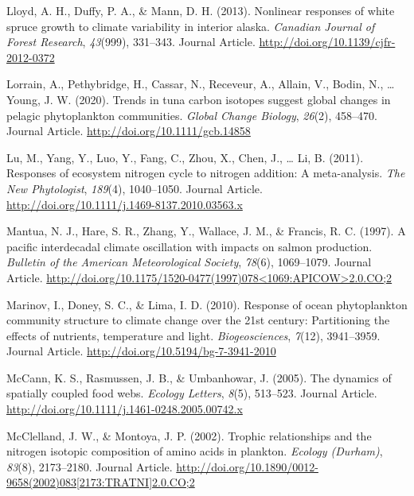 \documentclass [11pt, proquest] {uwthesis}[2015/03/03]
\begin{document}
\hypertarget{ref-Lloyd2013}{}
Lloyd, A. H., Duffy, P. A., \& Mann, D. H. (2013). Nonlinear responses
of white spruce growth to climate variability in interior alaska.
\emph{Canadian Journal of Forest Research}, \emph{43}(999), 331--343.
Journal Article. \url{http://doi.org/10.1139/cjfr-2012-0372}

\hypertarget{ref-Lorrain2020}{}
Lorrain, A., Pethybridge, H., Cassar, N., Receveur, A., Allain, V.,
Bodin, N., \ldots{} Young, J. W. (2020). Trends in tuna carbon isotopes
suggest global changes in pelagic phytoplankton communities.
\emph{Global Change Biology}, \emph{26}(2), 458--470. Journal Article.
\url{http://doi.org/10.1111/gcb.14858}

\hypertarget{ref-Lu2011}{}
Lu, M., Yang, Y., Luo, Y., Fang, C., Zhou, X., Chen, J., \ldots{} Li, B.
(2011). Responses of ecosystem nitrogen cycle to nitrogen addition: A
meta-analysis. \emph{The New Phytologist}, \emph{189}(4), 1040--1050.
Journal Article. \url{http://doi.org/10.1111/j.1469-8137.2010.03563.x}

\hypertarget{ref-Mantua1997}{}
Mantua, N. J., Hare, S. R., Zhang, Y., Wallace, J. M., \& Francis, R. C.
(1997). A pacific interdecadal climate oscillation with impacts on
salmon production. \emph{Bulletin of the American Meteorological
Society}, \emph{78}(6), 1069--1079. Journal Article.
\href{http://doi.org/10.1175/1520-0477(1997)078\%3C1069:APICOW\%3E2.0.CO;2}{http://doi.org/10.1175/1520-0477(1997)078\textless{}1069:APICOW\textgreater{}2.0.CO;2}

\hypertarget{ref-Marinov2010}{}
Marinov, I., Doney, S. C., \& Lima, I. D. (2010). Response of ocean
phytoplankton community structure to climate change over the 21st
century: Partitioning the effects of nutrients, temperature and light.
\emph{Biogeosciences}, \emph{7}(12), 3941--3959. Journal Article.
\url{http://doi.org/10.5194/bg-7-3941-2010}

\hypertarget{ref-McCann2005}{}
McCann, K. S., Rasmussen, J. B., \& Umbanhowar, J. (2005). The dynamics
of spatially coupled food webs. \emph{Ecology Letters}, \emph{8}(5),
513--523. Journal Article.
\url{http://doi.org/10.1111/j.1461-0248.2005.00742.x}

\hypertarget{ref-McClelland2002}{}
McClelland, J. W., \& Montoya, J. P. (2002). Trophic relationships and
the nitrogen isotopic composition of amino acids in plankton.
\emph{Ecology (Durham)}, \emph{83}(8), 2173--2180. Journal Article.
\href{http://doi.org/10.1890/0012-9658(2002)083\%5B2173:TRATNI\%5D2.0.CO;2}{http://doi.org/10.1890/0012-9658(2002)083{[}2173:TRATNI{]}2.0.CO;2}
\end{document}
